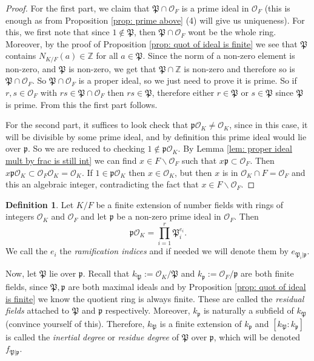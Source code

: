 \documentclass[11pt,a4paper]{report}
\theoremstyle{plain}
\theoremstyle{definition}
\newtheorem{defn}[subsection]{Definition}
\theoremstyle{definition}
\newcommand{\ZZ}{\mathbb{Z}}
\def \gothP{\mathfrak{P}}
\def\gothp{\mathfrak{p}}
\def \OO {\mathcal{O}}
\begin{document}
\begin{proof}
For the first part, we claim that $\gothP \cap \OO_F$ is a prime ideal in $\OO_F$ (this is enough as from Proposition \ref{prop: prime above} (4) will give us uniqueness). For this, we first note that since $1 \not \in \gothP$, then $\gothP \cap \OO_F$ wont be the whole ring. Moreover, by the proof of Proposition \ref{prop: quot of ideal is finite} we see that $\gothP$ contains $N_{K/F}(a) \in \ZZ$ for all $a \in \gothP$. Since the norm of a non-zero element is non-zero, and $\gothP$ is non-zero, we get that $\gothP \cap \ZZ$ is non-zero and therefore so is $\gothP \cap \OO_F$. So $\gothP \cap \OO_F$ is a proper ideal, so we just need to prove it is prime. So if $r,s \in \OO_F$ with $rs \in \gothP \cap \OO_F$ then $rs \in \gothP$, therefore either $r \in \gothP$ or $s \in \gothP$ since $\gothP$ is prime. From this the first part follows.

For the second part, it suffices to look check that $\gothp\OO_K \neq \OO_K$, since in this case, it will be divisible by some prime ideal, and by definition this prime ideal would lie over $\gothp$. So we are reduced to checking $1 \not \in \gothp\OO_K.$ By Lemma \ref{lem: proper ideal mult by frac is still int} we can find $x \in F \backslash \OO_F$ such that $x \gothp \subset \OO_F$. Then $x\gothp\OO_K \subset \OO_F\OO_K=\OO_K$. If $1 \in \gothp\OO_K$ then $x \in \OO_K$, but then $x$ is in $\OO_K \cap F=\OO_F$ and this an algebraic integer, contradicting the fact that $x \in F \backslash \OO_F$.

\end{proof}

\begin{defn}\label{defn: ram index and inert deg}
Let $K/F$ be a finite extension of number fields with rings of integers $\OO_K$ and $\OO_F$ and let $\gothp$ be a non-zero prime ideal in $\OO_F$. Then \[\gothp\OO_K= \prod_{i=1}^r \gothP_i^{e_i}.\] We call the $e_i$ the \textit{ramification indices} and if needed we will denote them by $e_{\gothP_i|\gothp}$.

Now, let $\gothP$ lie over $\gothp$. Recall that $k_{\gothP}:=\OO_K/\gothP$ and $k_\gothp:=\OO_F/\gothp$ are both finite fields, since $\gothP,\gothp$ are both maximal ideals and by Proposition \ref{prop: quot of ideal is finite} we know the quotient ring is always finite. These are called the \textit{residual fields} attached to $\gothP$ and $\gothp$ respectively. Moreover, $k_\gothp$ is naturally a subfield of $k_{\gothP}$ (convince yourself of this). Therefore, $k_{\gothP}$  is a finite extension of $k_{\gothp}$ and $[k_{\gothP}:k_{\gothp}]$ is called the \textit{inertial degree} or \textit{residue degree} of $\gothP$ over $\gothp$, which will be denoted $f_{\gothP|\gothp}$.
\end{defn}
\end{document}
